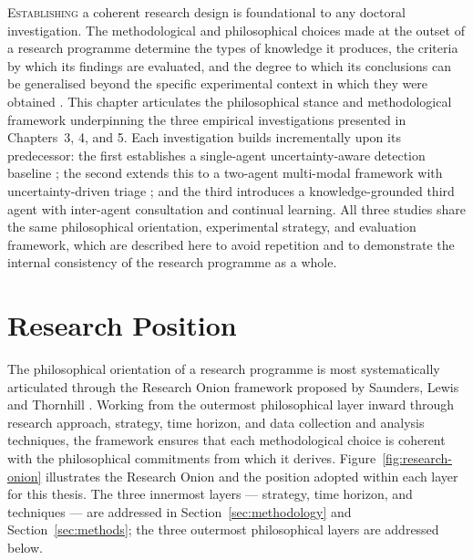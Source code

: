 
\lettrine{E}{stablishing} a coherent research design is foundational to any doctoral investigation.
The methodological and philosophical choices made at the outset of a research programme determine
the types of knowledge it produces, the criteria by which its findings are evaluated, and the degree
to which its conclusions can be generalised beyond the specific experimental context in which they
were obtained \cite{saunders2019research}.
This chapter articulates the philosophical stance and methodological framework underpinning the
three empirical investigations presented in Chapters~3, 4, and 5.
Each investigation builds incrementally upon its predecessor: the first establishes a single-agent
uncertainty-aware detection baseline \cite{kabuye2025explainable}; the second extends this to a
two-agent multi-modal framework with uncertainty-driven triage \cite{kabuye2026sabre}; and
the third introduces a knowledge-grounded third agent with inter-agent consultation and continual
learning.
All three studies share the same philosophical orientation, experimental strategy, and evaluation
framework, which are described here to avoid repetition and to demonstrate the internal consistency
of the research programme as a whole.

\section{Research Position}
\label{sec:research_position}

The philosophical orientation of a research programme is most systematically articulated through
the Research Onion framework proposed by Saunders, Lewis and Thornhill \cite{saunders2019research}.
Working from the outermost philosophical layer inward through research approach, strategy, time
horizon, and data collection and analysis techniques, the framework ensures that each methodological
choice is coherent with the philosophical commitments from which it derives.
Figure~\ref{fig:research-onion} illustrates the Research Onion and the position adopted within each
layer for this thesis.
The three innermost layers — strategy, time horizon, and techniques — are addressed in
Section~\ref{sec:methodology} and Section~\ref{sec:methods}; the three outermost philosophical
layers are addressed below.

